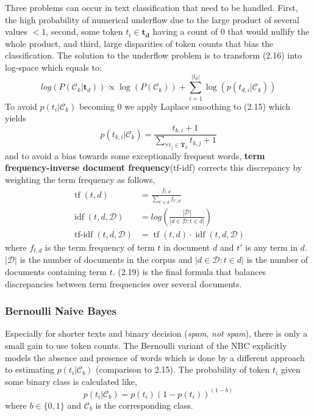   Three problems can occur in text classification that need to be handled.
  First, the high probability of numerical underflow due to the large product of several values $<1$, second, some token $t_i \in \boldsymbol{t_d}$ having a count of $0$ that would nullify the whole product, and third, large disparities of token counts that bias the classification.
  The solution to the underflow problem is to transform (2.16) into log-space which equals to:
  \[log(P(\mathcal{C}_k|\boldsymbol{t}_d)) \propto \log(P(\mathcal{C}_k)) + \sum_{i=1}^{|t_{d}|} \log({p(t_{d,i}|\mathcal{C}_k)}) \]
  To avoid $p({t_{i}}|\mathcal{C}_k)$ becoming $0$ we apply Laplace smoothing to (2.15) which yields
  \[ p({t_{k,i}}|\mathcal{C}_k) = \frac{t_{k, i} + 1}{\sum_{\forall t_j \in \boldsymbol{T}_k} t_{k, j} + 1} \]
  and to avoid a bias towards some exceptionally frequent words, \textbf{term frequency-inverse document frequency}(\gls{tf-idf}) corrects this discrepancy by weighting the term frequency as follows,
  \begin{align}
    \operatorname{tf}(t,d) &= \frac{f_{t,d}}{\sum_{t' \in d} f_{t',d}}\\
    \operatorname{idf}(t,d, \mathcal{D}) &= log\left( \frac{|\mathcal{D}|}{|d \in \mathcal{D}: t \in d|}\right)\\
    \operatorname{tf-idf}(t,d, \mathcal{D}) &= \operatorname{tf}(t,d) \cdot \operatorname{idf}(t, d, \mathcal{D})
  \end{align}
  where $f_{t,d}$ is the term frequency of term $t$ in document $d$ and $t'$ is any term in $d$.
  $|\mathcal{D}|$ is the number of documents in the corpus and $|d \in \mathcal{D}: t \in d|$ is the number of documents containing term $t$.
  (2.19) is the final formula that balances discrepancies between term frequencies over several documents.

\subsubsection{Bernoulli Naive Bayes}
  Especially for shorter texts and binary decision (\textsl{spam}, \textsl{not spam}), there is only a small gain to use token counts.
  The Bernoulli variant of the NBC explicitly models the absence and presence of words which is done by a different approach to estimating $p(t_{i}|\mathcal{C}_b)$ (comparison to 2.15).
  The probability of token $t_i$ given some binary class is calculated like,
  \[p(t_{i}|\mathcal{C}_b) = p(t_{i})(1-p(t_{i}))^{(1-b)}\]
  where $b \in \{0,1\}$ and $\mathcal{C}_b$ is the corresponding class.

